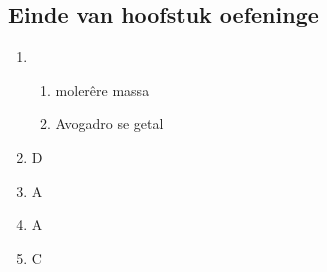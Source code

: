 \subsection{Einde van hoofstuk oefeninge}
\begin{multicols}{4}
 \begin{enumerate}[noitemsep, label=\textbf{(\arabic*)} ]
  \item 
\begin{enumerate}[noitemsep, label=\textbf{(\alph*)} ]
 \item moler\^{e}re massa
\item Avogadro se getal
\end{enumerate}

 \item D
\item A
\item A
\item C


\end{enumerate}
\end{multicols}
